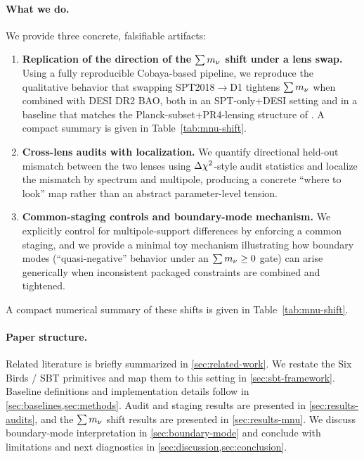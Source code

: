 \paragraph{What we do.}
We provide three concrete, falsifiable artifacts:

\begin{enumerate}[leftmargin=*, itemsep=2pt]
  \item \textbf{Replication of the direction of the $\sum m_\nu$ shift under a lens swap.}
  Using a fully reproducible Cobaya-based pipeline, we reproduce the qualitative behavior that swapping SPT2018$\rightarrow$D1 tightens $\sum m_\nu$ when combined with DESI DR2 BAO, both in an SPT-only+DESI setting and in a baseline that matches the Planck-subset+PR4-lensing structure of \cite{arxiv2601_16277}. A compact summary is given in Table~\ref{tab:mnu-shift}.
  \item \textbf{Cross-lens audits with localization.}
  We quantify directional held-out mismatch between the two lenses using $\Delta \chi^2$-style audit statistics and localize the mismatch by spectrum and multipole, producing a concrete ``where to look'' map rather than an abstract parameter-level tension.
  \item \textbf{Common-staging controls and boundary-mode mechanism.}
  We explicitly control for multipole-support differences by enforcing a common staging, and we provide a minimal toy mechanism illustrating how boundary modes (``quasi-negative'' behavior under an $\sum m_\nu\ge0$ gate) can arise generically when inconsistent packaged constraints are combined and tightened.
\end{enumerate}

A compact numerical summary of these shifts is given in Table~\ref{tab:mnu-shift}.

\paragraph{Paper structure.}
Related literature is briefly summarized in \cref{sec:related-work}. We restate the Six Birds / SBT primitives and map them to this setting in \cref{sec:sbt-framework}. Baseline definitions and implementation details follow in \cref{sec:baselines,sec:methods}. Audit and staging results are presented in \cref{sec:results-audits}, and the $\sum m_\nu$ shift results are presented in \cref{sec:results-mnu}. We discuss boundary-mode interpretation in \cref{sec:boundary-mode} and conclude with limitations and next diagnostics in \cref{sec:discussion,sec:conclusion}.

